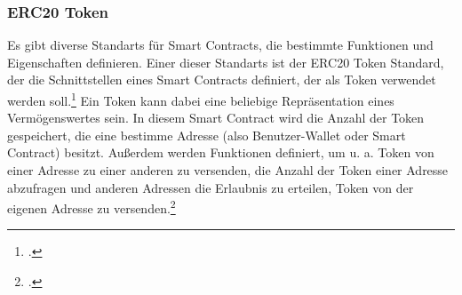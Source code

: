 
\subsubsection{ERC20 Token}
\label{sec:definition-erc20-token}
Es gibt diverse Standarts für Smart Contracts, die bestimmte Funktionen und Eigenschaften definieren.
Einer dieser Standarts ist der ERC20 Token Standard, der die Schnittstellen eines Smart Contracts definiert, der als Token verwendet werden soll.\footcite[Vgl. hierzu und im Folgenden][]{w7}
Ein Token kann dabei eine beliebige Repräsentation eines Vermögenswertes sein.
In diesem Smart Contract wird die Anzahl der Token gespeichert, die eine bestimme Adresse (also Benutzer-Wallet oder Smart Contract) besitzt.
Außerdem werden Funktionen definiert, um u. a. Token von einer Adresse zu einer anderen zu versenden, die Anzahl der Token einer Adresse abzufragen und anderen Adressen die Erlaubnis zu erteilen, Token von der eigenen Adresse zu versenden.\footcites[Vgl.][]{w8}[]{w7}

